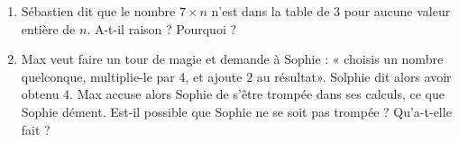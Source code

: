 
\begin{exercice}\label{exo2smath-0099}

    \begin{enumerate}
        \item
            
    Sébastien dit que le nombre \( 7\times n\) n'est dans la table de \( 3\) pour aucune valeur entière de \( n\). A-t-il raison ? Pourquoi ?

\item

    Max veut faire un tour de magie et demande à Sophie : « choisis un nombre quelconque, multiplie-le par 4, et ajoute \( 2\) au résultat». Solphie dit alors avoir obtenu \( 4\). Max accuse alors Sophie de s'être trompée dans ses calculs, ce que Sophie dément. Est-il possible que Sophie ne se soit pas trompée ? Qu'a-t-elle fait ?
    
    \end{enumerate}

\end{exercice}
